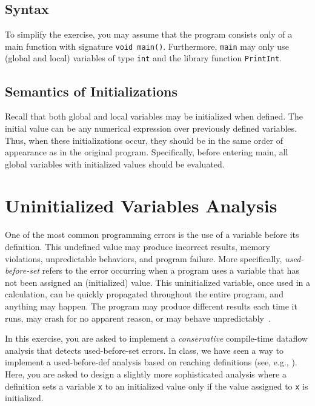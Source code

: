 \documentclass{article}
\begin{document}
\subsection{Syntax}
To simplify the exercise, you may assume that the program consists only of a main function with signature \texttt{void main()}.
Furthermore, \texttt{main} may only use (global and local) variables of type \texttt{int} and the library function \texttt{PrintInt}.

\subsection{Semantics of Initializations}
Recall that both global and local variables may be initialized when defined.
The initial value can be any numerical expression over previously defined variables.
Thus, when these initializations occur, they should be in the same order of appearance as in the original program.
Specifically, before entering main, all global variables with initialized values should be evaluated.
 
\section{Uninitialized Variables Analysis}

One of the most common programming errors is the use of a
variable before its definition. This undefined value may produce incorrect
results, memory violations, unpredictable behaviors, and program failure.
More specifically, \emph{used-before-set} refers to the error occurring when a program uses a variable that has not been assigned an (initialized) value. This uninitialized variable, once used in
a calculation, can be quickly propagated throughout the entire program, and
anything may happen. The program may produce different results each time it
runs, may crash for no apparent reason, or may behave unpredictably~\cite{uninitvar}. 

In this exercise, you are asked to implement a \emph{conservative} compile-time dataflow analysis that detects used-before-set errors.
In class, we have seen a way to implement a used-before-def analysis based on reaching definitions (see, e.g., \cite[Sec. 9.2.4]{dragonbook}).
Here, you are asked to design a slightly more sophisticated analysis where a definition sets a variable \texttt{x} to an initialized value only if the value assigned to \texttt{x}  is initialized.
\end{document}
